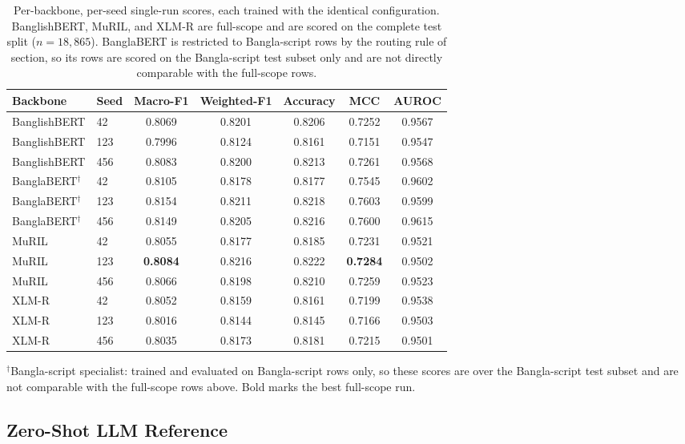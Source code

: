 \documentclass[11pt,a4paper]{article}
\def\cref#1{section}%
\begin{document}
\begin{table}[!htbp]
\centering
\caption{Per-backbone, per-seed single-run scores, each trained with the identical configuration. BanglishBERT, MuRIL, and XLM-R are full-scope and are scored on the complete test split ($n = 18{,}865$). BanglaBERT is restricted to Bangla-script rows by the routing rule of \cref{sec:scriptaware}, so its rows are scored on the Bangla-script test subset only and are not directly comparable with the full-scope rows.}
\label{tab:perrun}
\small
\begin{tabular}{@{}llccccc@{}}
\toprule
\textbf{Backbone} & \textbf{Seed} & \textbf{Macro-F1} & \textbf{Weighted-F1} & \textbf{Accuracy} & \textbf{MCC} & \textbf{AUROC} \\
\midrule
BanglishBERT & 42 & 0.8069 & 0.8201 & 0.8206 & 0.7252 & 0.9567 \\
BanglishBERT & 123 & 0.7996 & 0.8124 & 0.8161 & 0.7151 & 0.9547 \\
BanglishBERT & 456 & 0.8083 & 0.8200 & 0.8213 & 0.7261 & 0.9568 \\
BanglaBERT$^{\dagger}$ & 42 & 0.8105 & 0.8178 & 0.8177 & 0.7545 & 0.9602 \\
BanglaBERT$^{\dagger}$ & 123 & 0.8154 & 0.8211 & 0.8218 & 0.7603 & 0.9599 \\
BanglaBERT$^{\dagger}$ & 456 & 0.8149 & 0.8205 & 0.8216 & 0.7600 & 0.9615 \\
MuRIL & 42 & 0.8055 & 0.8177 & 0.8185 & 0.7231 & 0.9521 \\
MuRIL & 123 & \textbf{0.8084} & 0.8216 & 0.8222 & \textbf{0.7284} & 0.9502 \\
MuRIL & 456 & 0.8066 & 0.8198 & 0.8210 & 0.7259 & 0.9523 \\
XLM-R & 42 & 0.8052 & 0.8159 & 0.8161 & 0.7199 & 0.9538 \\
XLM-R & 123 & 0.8016 & 0.8144 & 0.8145 & 0.7166 & 0.9503 \\
XLM-R & 456 & 0.8035 & 0.8173 & 0.8181 & 0.7215 & 0.9501 \\
\bottomrule
\end{tabular}

\vspace{2pt}
{\footnotesize $^{\dagger}$Bangla-script specialist: trained and evaluated on Bangla-script rows only, so these
scores are over the Bangla-script test subset and are not comparable with the full-scope rows above.
Bold marks the best full-scope run.}
\end{table}

\subsection{Zero-Shot LLM Reference}
\label{sec:llm-baseline}
\end{document}
